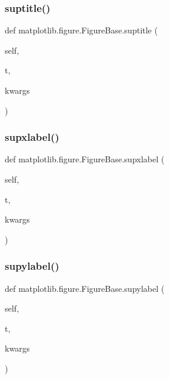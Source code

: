 \begin{DoxyVerb}
\begin{DoxyVerb}
\subsubsection{\texorpdfstring{suptitle()}{suptitle()}}
{\footnotesize\ttfamily def matplotlib.\+figure.\+Figure\+Base.\+suptitle (\begin{DoxyParamCaption}\item[{}]{self,  }\item[{}]{t,  }\item[{}]{kwargs }\end{DoxyParamCaption})}

\mbox{\label{classmatplotlib_1_1figure_1_1FigureBase_a7cb085ad52231d27a4ae37b1015221b8}} 
\subsubsection{\texorpdfstring{supxlabel()}{supxlabel()}}
{\footnotesize\ttfamily def matplotlib.\+figure.\+Figure\+Base.\+supxlabel (\begin{DoxyParamCaption}\item[{}]{self,  }\item[{}]{t,  }\item[{}]{kwargs }\end{DoxyParamCaption})}

\mbox{\label{classmatplotlib_1_1figure_1_1FigureBase_ad0a62077059599432dab8f5df4f75137}} 
\subsubsection{\texorpdfstring{supylabel()}{supylabel()}}
{\footnotesize\ttfamily def matplotlib.\+figure.\+Figure\+Base.\+supylabel (\begin{DoxyParamCaption}\item[{}]{self,  }\item[{}]{t,  }\item[{}]{kwargs }\end{DoxyParamCaption})}


\end{DoxyVerb}
\end{DoxyVerb}

